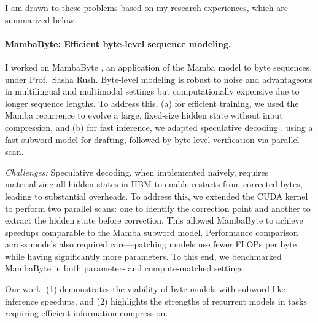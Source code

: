 
I am drawn to these problems based on my research experiences, which are summarized below.

\paragraph{MambaByte: Efficient byte-level sequence modeling.}

I worked on MambaByte \citep{wang_mambabyte_2024}, an application of the Mamba model \citep{gu_mamba_2024} to byte sequences, under Prof.~Sasha Rush.
%
Byte-level modeling is robust to noise and advantageous in multilingual and multimodal settings but computationally expensive due to longer sequence lengths.
%
To address this,
%
(a) for efficient training, we used the Mamba recurrence to evolve a large, fixed-size hidden state without input compression, and
%
(b) for fast inference, we adapted speculative decoding \citep{leviathan_fast_2023}, using a fast subword model for drafting, followed by byte-level verification via parallel scan.

\textit{Challenges:}
%
Speculative decoding, when implemented naively, requires materializing all hidden states in HBM to enable restarts from corrected bytes, leading to substantial overheads.
%
To address this, we extended the CUDA kernel to perform two parallel scans: one to identify the correction point and another to extract the hidden state before correction.
%
This allowed MambaByte to achieve speedups comparable to the Mamba subword model.
%
Performance comparison across models also required care---patching models use fewer FLOPs per byte while having significantly more parameters.
%
To this end, we benchmarked MambaByte in both parameter- and compute-matched settings.

Our work:
%
(1) demonstrates the viability of byte models with subword-like inference speedups, and
%
(2) highlights the strengths of recurrent models in tasks requiring efficient information compression.

